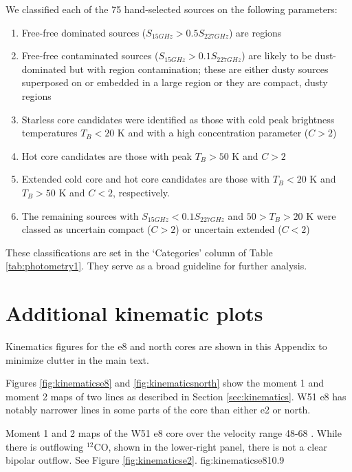 \documentclass[twocolumn]{aastex61}
\begin{document}
We classified each of the 75 hand-selected sources on the following parameters:
\begin{enumerate}
    \item Free-free dominated sources ($S_{15 GHz} > 0.5 S_{227 GHz}$) are \hii
        regions
    \item Free-free contaminated sources ($S_{15 GHz} > 0.1 S_{227 GHz}$) are
        likely to be dust-dominated but with \hii region contamination; these
        are either dusty sources superposed on or embedded in a large \hii
        region or they are compact, dusty \hii regions
    \item Starless core candidates were identified as those with cold peak
        brightness temperatures $T_B < 20$ K and with a high concentration
        parameter ($C>2$)
    \item Hot core candidates are those with peak $T_B>50$ K and $C>2$
    \item Extended cold core and hot core candidates are those with $T_B<20$ K
        and $T_B>50$ K and $C<2$, respectively.
    \item The remaining sources with $S_{15 GHz} < 0.1 S_{227 GHz}$ and $50 >
        T_B > 20$ K were classed as uncertain compact ($C>2$) or uncertain extended
        ($C<2$)
\end{enumerate}

These classifications are set in the `Categories' column of Table
\ref{tab:photometry1}.  They serve as a broad guideline for further
analysis.   



\section{Additional kinematic plots}
Kinematics figures for the e8 and north cores are shown in this Appendix to
minimize clutter in the main text.

Figures \ref{fig:kinematicse8} and \ref{fig:kinematicsnorth} show the moment 1
and moment 2 maps of two \methanol lines as described in Section
\ref{sec:kinematics}.  W51 e8 has notably narrower lines in some parts of 
the core than either e2 or north.

{Moment 1 and 2 maps of the W51 e8 core over the velocity
range 48-68 \kms.  While there is  outflowing $^{12}$CO, shown in the
lower-right panel, there is not a clear bipolar outflow. See Figure
\ref{fig:kinematicse2}.}
{fig:kinematicse8}{1}{0.9\textwidth}
\end{document}
